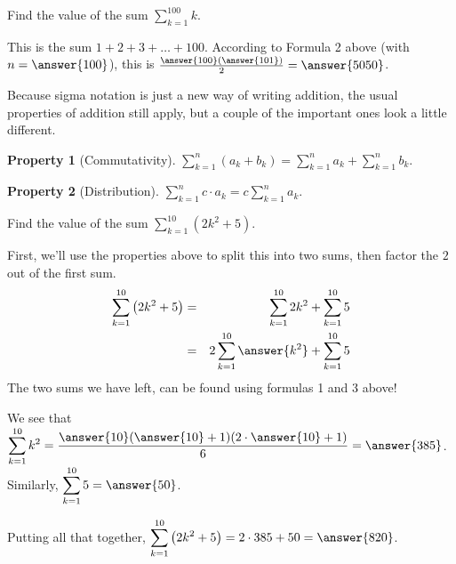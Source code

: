 \documentclass[12pt]{ximera}
\theoremstyle{definition}
\newtheorem{prop}{Property}
\newcommand{\hop}{\vskip 0.18in}
\begin{document}
\begin{example}
	Find the value of the sum $\displaystyle \sum_{k=1}^{100} k$.
	\begin{explanation}
		This is the sum $1+2+3+ \ldots + 100$.  According to Formula 2 above (with $n=\answer{100}$), this is $\frac{\answer{100}(\answer{101})}{2} = \answer{5050}$.	
	\end{explanation}
\end{example}

\hop

 Because sigma notation is just a new way of writing addition, the usual properties of addition still apply, but a couple of the important ones look a little different.
 \begin{prop}[Commutativity]
 	$\displaystyle \sum_{k=1}^{n} (a_k + b_k) = \sum_{k=1}^n a_k + \sum_{k=1}^n b_k$.
 \end{prop}
 \begin{prop}[Distribution]
 	$\displaystyle \sum_{k=1}^{n} c \cdot a_k = c \sum_{k=1}^n a_k$.
 \end{prop}

\begin{example}
	Find the value of the sum $\displaystyle \sum_{k=1}^{10} \left(2k^2+5\right)$.
	\begin{explanation}
		First, we'll use the properties above to split this into two sums, then factor the $2$ out of the first sum.
		\begin{eqnarray*}
			\sum_{k=1}^{10} \left(2k^2+5\right) &=& \sum_{k=1}^{10} 2k^2 + \sum_{k=1}^{10} 5\\
				&=& 2 \sum_{k=1}^{10} \answer{k^2} + \sum_{k=1}^{10} 5
		\end{eqnarray*}
		The two sums we have left, can be found using formulas 1 and 3 above!
		
		 We see that $\displaystyle \sum_{k=1}^{10} k^2 = \frac{\answer{10}(\answer{10}+1)(2\cdot \answer{10}+1)}{6} = \answer{385}$.  Similarly, $\displaystyle \sum_{k=1}^{10} 5 = \answer{50}$.
		
		 Putting all that together, $\displaystyle \sum_{k=1}^{10}\left(2k^2+5\right) = 2 \cdot 385 + 50 = \answer{820}$.
	\end{explanation}
\end{example}
\hop
\end{document}
